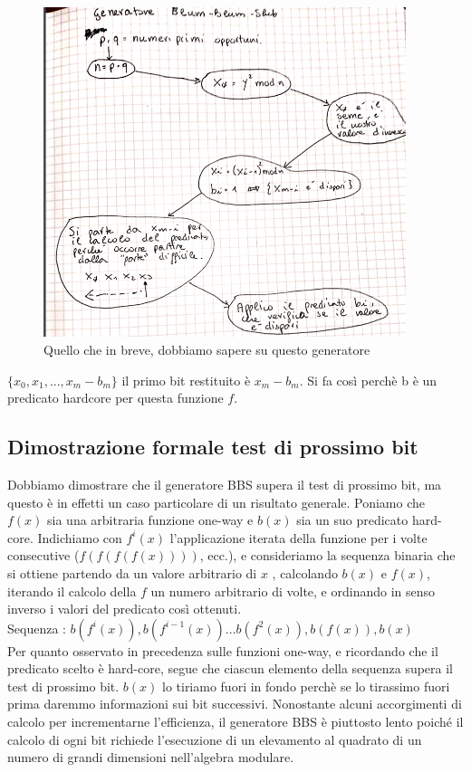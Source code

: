 \begin{figure}[htp]
	\includegraphics[width=300pt]{./img/blumblumshub.png}
	\caption{Quello che in breve, dobbiamo sapere su questo generatore}
	\label{img:blumblumshub}
\end{figure}

$\{x_0, x_1, ..., x_m - b_m\}$ il primo bit restituito è $x_m - b_m$. Si fa così perchè b è un predicato hardcore per questa funzione $f$.

\subsection{Dimostrazione formale test di prossimo bit}

Dobbiamo dimostrare che il generatore BBS supera il test di prossimo bit, ma questo è in effetti un caso particolare di un risultato generale. Poniamo che $f(x)$ sia una
arbitraria funzione one-way e $b(x)$ sia un suo predicato hard-core. Indichiamo con $f^{i}(x)$ l’applicazione iterata della funzione per i volte consecutive ($f(f(f(f(x))))$, ecc.), e consideriamo la sequenza binaria che si ottiene partendo da un valore arbitrario di $x$ , calcolando $b(x)$ e $f(x)$, iterando il calcolo della $f$ un numero arbitrario di volte, e ordinando in senso inverso i valori del predicato così ottenuti.\\
Sequenza : $b(f^{i}(x)), b(f^{i - 1}(x))...b(f^{2}(x)), b(f(x)), b(x)$\\
Per quanto osservato in precedenza sulle funzioni one-way, e ricordando che il predicato scelto è hard-core, segue che ciascun elemento della sequenza supera il test di prossimo
bit. $b(x)$ lo tiriamo fuori in fondo perchè se lo tirassimo fuori prima daremmo informazioni sui bit successivi. Nonostante alcuni accorgimenti di calcolo per incrementarne l’efficienza, il generatore BBS è piuttosto lento poiché il calcolo di ogni bit richiede l’esecuzione di un elevamento al quadrato di un numero di grandi
dimensioni nell’algebra modulare.

